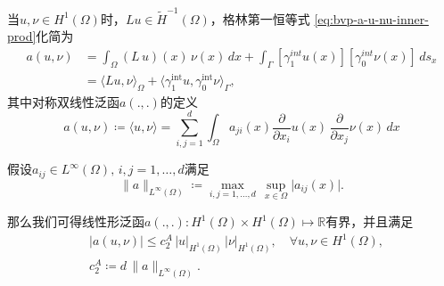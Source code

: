 当$u, \nu \in H^1(\Omega)$时，$Lu \in \widetilde{H}^{-1}(\Omega)$，格林第一恒等式 \eqref{eq:bvp-a-u-nu-inner-prod}化简为
\begin{equation}
  \label{eq:var-bvp-green-1st-identity}
\begin{split}
    a\left(u,\nu \right) &=\int_{\Omega} \left( L \, u \right)(x) \, \nu(x) \, dx + \int_{\Gamma} \left[ \gamma_1^{int} u(x) \right]  \left[ \gamma_0^{int} \nu(x) \right] \, d s_x \\
    &= \langle Lu, \nu \rangle_{\Omega} + \langle \gamma_1^{\text{int}} u, \gamma_0^{\text{int}} \nu \rangle_{\Gamma},
\end{split}
\end{equation}
其中对称双线性泛函$a(.,.)$的定义
\begin{equation}
  \label{eq:var-bvp-bilinear-form-a-def}
  a \left(u,\nu \right) \coloneqq \langle u, \nu \rangle = \sum_{i,j=1}^d \int_{\Omega} a_{ji}(x) \frac{\partial}{\partial x_i} u(x) \, \frac{\partial}{\partial x_j} \nu(x) \, dx
\end{equation}

\begin{lemma}
  \label{lemma:var-bvp-aform-inequality}
  假设$a_{ij} \in L^{\infty}(\Omega), \, i,j = 1,\ldots,d$满足
  \begin{equation}
    \label{eq:var-bvp-coeff-norm}
    \big\| a \big\|_{L^{\infty}(\Omega)} \coloneqq \max_{i,j=1,\ldots,d} \, \sup_{x \in \Omega} \big| a_{ij}(x) \big|.
  \end{equation}

  那么我们可得线性形泛函$a(.,.): H^{1}(\Omega) \times H^{1}(\Omega) \mapsto \mathbb{R}$有界，并且满足
  \begin{equation}
    \label{eq:var-bvp-a-c2a-inequality}
    \begin{split}
    &\big| a (u, \nu) \big| \le c_2^A \, \big| u \big|_{H^{1}(\Omega)} \, \big| \nu \big|_{H^1(\Omega)}, \quad \forall u, \nu \in H^{1}(\Omega), \\
    & c_2^A \coloneqq d \, \big\| a \big\|_{L^{\infty}(\Omega)}.
  \end{split}
\end{equation}
\end{lemma}


